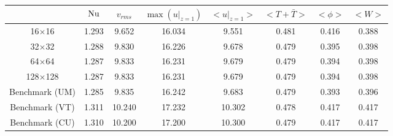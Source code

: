 \begin{tabular}{c|ccccccc}
    & $\mathrm{Nu}$ & $v_{rms}$ & $\max(u|_{z=1})$ & $<u|_{z=1}>$ & $<T + \bar{T}>$ & $<\phi>$ & $<W>$ \\
\hline
16$\times$16 & 1.293 & 9.652 & 16.034 & 9.551 & 0.481 & 0.416 & 0.388 \\
32$\times$32 & 1.288 & 9.830 & 16.226 & 9.678 & 0.479 & 0.395 & 0.398 \\
64$\times$64 & 1.287 & 9.833 & 16.231 & 9.679 & 0.479 & 0.394 & 0.398 \\
128$\times$128 & 1.287 & 9.833 & 16.231 & 9.679 & 0.479 & 0.394 & 0.398 \\
\hline
Benchmark (UM) & 1.285 & 9.835 & 16.242 & 9.683 & 0.479 & 0.393 & 0.396 \\
Benchmark (VT) & 1.311 & 10.240 & 17.232 & 10.302 & 0.478 & 0.417 & 0.417 \\
Benchmark (CU) & 1.310 & 10.200 & 17.200 & 10.300 & 0.479 & 0.417 & 0.417 \\
\end{tabular}
